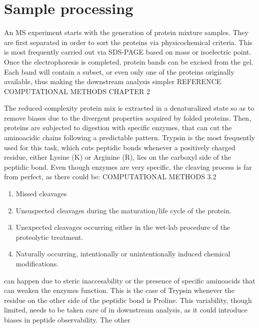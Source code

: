 \documentclass[11pt, a4paper]{report}
\begin{document}
\section{Sample processing}
\label{sec:sample_processing}

An \ac{MS} experiment starts with the generation of protein mixture samples. They are first separated in order to sort the proteins via physicochemical criteria. This is most frequently carried out via SDS-PAGE based on mass or isoelectric point. Once the electrophoresis is completed, protein bands can be excised from the gel. Each band will contain a subset, or even only one of the proteins originally available, thus making the downstream analysis simpler \cite{Barsnes2008} REFERENCE COMPUTATIONAL METHODS CHAPTER 2

The reduced complexity protein mix is extracted in a denaturalized state so as to remove biases due to the divergent properties acquired by folded proteins. Then, proteins are subjected to digestion with specific enzymes, that can cut the aminoacidic chains following a predictable pattern. Trypsin is the most frequently used for this task, which cuts peptidic bonds whenever a positively charged residue, either Lysine (K) or Arginine (R), lies on the carboxyl side of the peptidic bond. Even though enzymes are very specific, the cleaving process is far from perfect, as there could be: \cite{Barsnes2008} COMPUTATIONAL METHODS 3.2

\begin{enumerate}

\item Missed cleavages \label{item:missed_cleavages}

\item Unsuspected cleavages during the maturation/life cycle of the protein.

\item Unexpected cleavages occurring either in the wet-lab procedure of the proteolytic treatment.

\item Naturally occurring, intentionally or unintentionally induced chemical modifications.

\end{enumerate}

 can happen due to steric inaccesability or the presence of specific aminoacids that can weaken the enzyme\textquotesingle s function. This is the case of Trypsin whenever the residue on the other side of the peptidic bond is Proline. This variability, though limited, needs to be taken care of in downstream analysis, as it could introduce biases in peptide observability. The other 
\end{document}
